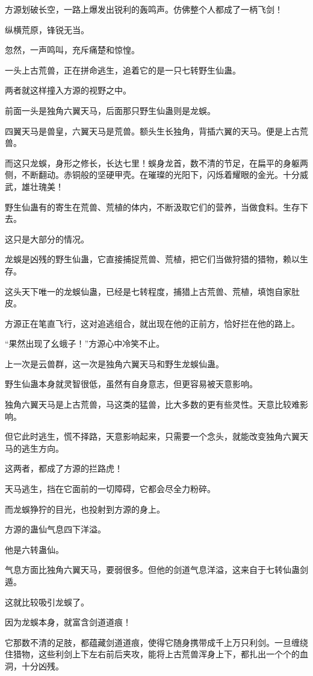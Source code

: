 \begin{this_body}
方源划破长空，一路上爆发出锐利的轰鸣声。仿佛整个人都成了一柄飞剑！

纵横荒原，锋锐无当。

忽然，一声鸣叫，充斥痛楚和惊惶。

一头上古荒兽，正在拼命逃生，追着它的是一只七转野生仙蛊。

两者就这样撞入方源的视野之中。

前面一头是独角六翼天马，后面那只野生仙蛊则是龙蜈。

四翼天马是兽皇，六翼天马是荒兽。额头生长独角，背插六翼的天马。便是上古荒兽。

而这只龙蜈，身形之修长，长达七里！蜈身龙首，数不清的节足，在扁平的身躯两侧，不断翻动。赤铜般的坚硬甲壳。在璀璨的光阳下，闪烁着耀眼的金光。十分威武，雄壮瑰美！

野生仙蛊有的寄生在荒兽、荒植的体内，不断汲取它们的营养，当做食料。生存下去。

这只是大部分的情况。

龙蜈是凶残的野生仙蛊，它直接捕捉荒兽、荒植，把它们当做狩猎的猎物，赖以生存。

这头天下唯一的龙蜈仙蛊，已经是七转程度，捕猎上古荒兽、荒植，填饱自家肚皮。

方源正在笔直飞行，这对追逃组合，就出现在他的正前方，恰好拦在他的路上。

“果然出现了幺蛾子！”方源心中冷笑不止。

上一次是云兽群，这一次是独角六翼天马和野生龙蜈仙蛊。

野生仙蛊本身就灵智很低，虽然有自身意志，但更容易被天意影响。

独角六翼天马是上古荒兽，马这类的猛兽，比大多数的更有些灵性。天意比较难影响。

但它此时逃生，慌不择路，天意影响起来，只需要一个念头，就能改变独角六翼天马的逃生方向。

这两者，都成了方源的拦路虎！

天马逃生，挡在它面前的一切障碍，它都会尽全力粉碎。

而龙蜈狰狞的目光，也投射到方源的身上。

方源的蛊仙气息四下洋溢。

他是六转蛊仙。

气息方面比独角六翼天马，要弱很多。但他的剑道气息洋溢，这来自于七转仙蛊剑遁。

这就比较吸引龙蜈了。

因为龙蜈本身，就富含剑道道痕！

它那数不清的足肢，都蕴藏剑道道痕，使得它随身携带成千上万只利剑。一旦缠绕住猎物，这些利剑上下左右前后夹攻，能将上古荒兽浑身上下，都扎出一个个的血洞，十分凶残。


\end{this_body}
